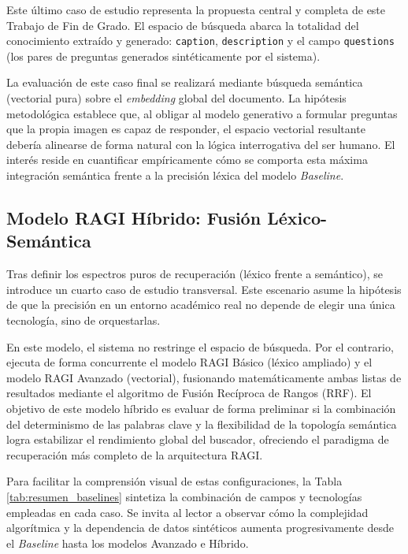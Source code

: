 \documentclass[a4paper]{report}
\begin{document}
Este último caso de estudio representa la propuesta central y completa de este Trabajo de Fin de Grado. El espacio de búsqueda abarca la totalidad del conocimiento extraído y generado: \texttt{caption}, \texttt{description} y el campo \texttt{questions} (los pares de preguntas generados sintéticamente por el sistema).

La evaluación de este caso final se realizará mediante búsqueda semántica (vectorial pura) sobre el \textit{embedding} global del documento. La hipótesis metodológica establece que, al obligar al modelo generativo a formular preguntas que la propia imagen es capaz de responder, el espacio vectorial resultante debería alinearse de forma natural con la lógica interrogativa del ser humano. El interés reside en cuantificar empíricamente cómo se comporta esta máxima integración semántica frente a la precisión léxica del modelo \textit{Baseline}.

\subsection{Modelo RAGI Híbrido: Fusión Léxico-Semántica}
\label{subsec:ragi_hibrido}

Tras definir los espectros puros de recuperación (léxico frente a semántico), se introduce un cuarto caso de estudio transversal. Este escenario asume la hipótesis de que la precisión en un entorno académico real no depende de elegir una única tecnología, sino de orquestarlas. 

En este modelo, el sistema no restringe el espacio de búsqueda. Por el contrario, ejecuta de forma concurrente el modelo RAGI Básico (léxico ampliado) y el modelo RAGI Avanzado (vectorial), fusionando matemáticamente ambas listas de resultados mediante el algoritmo de Fusión Recíproca de Rangos (RRF). El objetivo de este modelo híbrido es evaluar de forma preliminar si la combinación del determinismo de las palabras clave y la flexibilidad de la topología semántica logra estabilizar el rendimiento global del buscador, ofreciendo el paradigma de recuperación más completo de la arquitectura RAGI.

\vspace{0.5cm}

Para facilitar la comprensión visual de estas configuraciones, la Tabla \ref{tab:resumen_baselines} sintetiza la combinación de campos y tecnologías empleadas en cada caso. Se invita al lector a observar cómo la complejidad algorítmica y la dependencia de datos sintéticos aumenta progresivamente desde el \textit{Baseline} hasta los modelos Avanzado e Híbrido.
\end{document}
